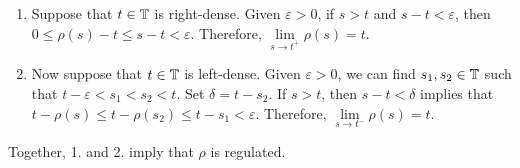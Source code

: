 \documentclass[nonumber, anonymous]{homework}
\begin{document}
	\begin{enumerate}
		\item Suppose that $t \in \mathbb{T}$ is right-dense. Given $\varepsilon > 0$, if $s > t$ and $s - t < \varepsilon$, then $0 \le \rho(s) - t \le s - t < \varepsilon$. Therefore, $\lim\limits_{s\to t^+}\rho(s) = t$.
		
		\item Now suppose that $t \in \mathbb{T}$ is left-dense. Given $\varepsilon>0$, we can find $s_1,s_2 \in \mathbb{T}$ such that $t-\varepsilon < s_1 < s_2 < t$. Set $\delta = t-s_2$. If $s > t$, then $s -t < \delta$ implies that $t-\rho(s) \le t-\rho(s_2) \le t-s_1 < \varepsilon$. Therefore, $\lim\limits_{s\to t^-}\rho(s) = t$.
	\end{enumerate}
	
	Together, 1. and 2. imply that $\rho$ is regulated.
\end{document}
